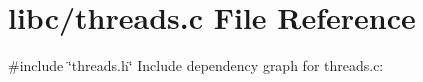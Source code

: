 \hypertarget{a00041}{}\section{libc/threads.c File Reference}
\label{a00041}
{\ttfamily \#include \char`\"{}threads.\+h\char`\"{}}\newline
Include dependency graph for threads.\+c\+:

